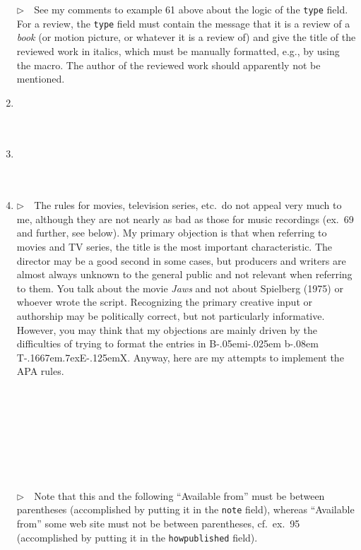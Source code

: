 \documentclass{article}
\def\BibTeX{{\rm B\kern-.05em{\sc i\kern-.025em b}\kern-.08em
    T\kern-.1667em\lower.7ex\hbox{E}\kern-.125emX}}%
\newcommand{\EM}{\ensuremath{\triangleright\quad}}
\newcommand{\fieldname}[1]{\texttt{#1}}%
\newcommand{\cmd}[1]{\texttt{\string#1}}%
\begin{document}
\begin{enumerate}
      \EM See my comments to example 61 above about the logic of the
      \fieldname{type} field. For a review, the \fieldname{type}
      field must contain the message that it is a review of a
      \emph{book} (or motion picture, or whatever it is a review of)
      and give the title of the reviewed work in italics, which must
      be manually formatted, e.g., by using the \cmd{\APACcitebtitle}
      macro. The author of the reviewed work should apparently not be
      mentioned.
\item \cite{ex63} \\ \cite{ex63}\\ \\ 
\item \cite{ex64} \\ \cite{ex64}\\ \\ 
\item \EM The rules for movies, television series, etc.\ do not appeal
      very much to me, although they are not nearly as bad as those
      for music recordings (ex.~69 and further, see below). My
      primary objection is that when referring to movies and TV series,
      the title is the most important characteristic. The director
      may be a good second in some cases, but producers and writers are
      almost always unknown to the general public and not relevant
      when referring to them. You talk about the movie \emph{Jaws}
      and not about Spielberg (1975) or whoever wrote the script.
      Recognizing the primary creative input or authorship may be
      politically correct, but not particularly informative.
      However, you may think that my objections are mainly
      driven by the difficulties of trying to format the entries
      in \BibTeX{}. Anyway, here are my attempts to implement
      the APA rules.\\
      \cite{ex65-1} \\ \cite{ex65-1}\\ \\  \\
      \cite{ex65-2} \\ \cite{ex65-2}\\ \\  \\
      \EM Note that this and the following ``Available from'' must be between
      parentheses (accomplished by putting it in the \fieldname{note} field),
      whereas ``Available from'' some web site must not be between
      parentheses, cf.\ ex.~95 (accomplished by putting it in the
      \fieldname{howpublished} field).


\end{enumerate}
\end{document}
